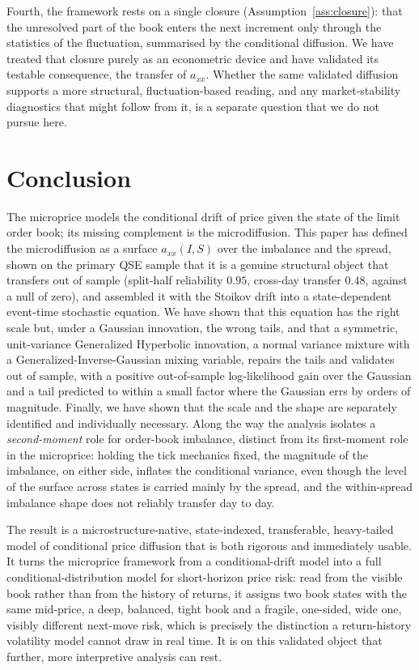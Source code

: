 \documentclass[11pt]{article}
\theoremstyle{plain}
\theoremstyle{definition}
\newcommand{\axx}{a_{xx}}
\begin{document}
Fourth, the framework rests on a single closure (Assumption~\ref{ass:closure}): that
the unresolved part of the book enters the next increment only through the statistics
of the fluctuation, summarised by the conditional diffusion. We have treated that
closure purely as an econometric device and have validated its testable consequence,
the transfer of $\axx$. Whether the same validated diffusion supports a more structural,
fluctuation-based reading, and any market-stability diagnostics that might follow from
it, is a separate question that we do not pursue here.

\FloatBarrier
\section{Conclusion}
\label{sec:conclusion}

The microprice models the conditional drift of price given the state of the limit
order book; its missing complement is the microdiffusion. This paper has
defined the microdiffusion as a surface $\axx(I,S)$ over the imbalance and the spread,
shown on the primary QSE sample that it is a genuine structural object that transfers
out of sample (split-half reliability $0.95$, cross-day transfer $0.48$, against a
null of zero), and assembled it with the
Stoikov drift into a state-dependent event-time stochastic equation. We have shown
that this equation has the right scale but, under a Gaussian innovation, the wrong
tails, and that a symmetric, unit-variance Generalized Hyperbolic innovation, a
normal variance mixture with a Generalized-Inverse-Gaussian mixing variable, repairs
the tails and validates out of sample, with a positive out-of-sample log-likelihood
gain over the Gaussian and a tail predicted to within a small factor where the
Gaussian errs by orders of magnitude. Finally, we have shown that the scale and the
shape are separately identified and individually necessary. Along the way the analysis
isolates a \emph{second-moment} role for order-book imbalance, distinct from its
first-moment role in the microprice: holding the tick mechanics fixed, the magnitude of
the imbalance, on either side, inflates the conditional variance, even though the level
of the surface across states is carried mainly by the spread, and the within-spread
imbalance shape does not reliably transfer day to day.

The result is a microstructure-native, state-indexed, transferable, heavy-tailed model of
conditional price diffusion that is both rigorous and immediately usable. It turns the
microprice framework from a conditional-drift model into a full conditional-distribution
model for short-horizon price risk: read from the visible book rather than from the history
of returns, it assigns two book states with the same mid-price, a deep, balanced, tight book
and a fragile, one-sided, wide one, visibly different next-move risk, which is precisely the
distinction a return-history volatility model cannot draw in real time. It is on this validated
object that further, more interpretive analysis can rest.
\end{document}
